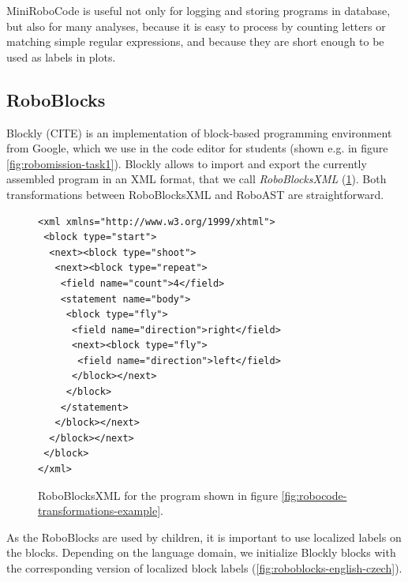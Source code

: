 MiniRoboCode is useful not only for logging and storing programs in database,
but also for many analyses, because it is easy to process by counting
letters or matching simple regular expressions, and because they are short
enough to be used as labels in plots.


\subsection{RoboBlocks}

Blockly (CITE) is an implementation of block-based programming
environment from Google,
which we use in the code editor for students
(shown e.g. in figure \ref{fig:robomission-task1}).
Blockly allows to import and export the currently assembled program in
an XML format, that we call \emph{RoboBlocksXML}
(\cref{fig:roboblocks-xml}).
Both transformations between RoboBlocksXML and RoboAST are straightforward.


\begin{figure}[h]
\begin{lstlisting}[basicstyle=\small\ttfamily]
<xml xmlns="http://www.w3.org/1999/xhtml">
 <block type="start">
  <next><block type="shoot">
   <next><block type="repeat">
    <field name="count">4</field>
    <statement name="body">
     <block type="fly">
      <field name="direction">right</field>
      <next><block type="fly">
       <field name="direction">left</field>
      </block></next>
     </block>
    </statement>
   </block></next>
  </block></next>
 </block>
</xml>
\end{lstlisting}
  \caption{%
    RoboBlocksXML for the program shown in figure %
    \ref{fig:robocode-transformations-example}.}
\label{fig:roboblocks-xml}
\end{figure}

As the RoboBlocks are used by children, it is important to use localized labels
on the blocks.
Depending on the language domain, we initialize Blockly blocks with the corresponding
version of localized block labels
(\cref{fig:roboblocks-english-czech}).

